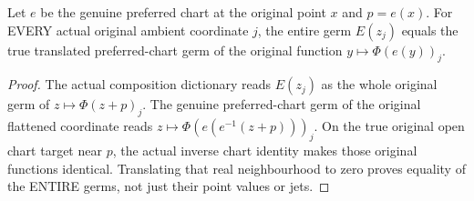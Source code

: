 \begin{lemma}
\label{hir:smooth-centre-whole-flattened-coordinate-dictionary}
\leanok
Let $e$ be the genuine preferred chart at the original point $x$ and $p=e(x)$.
For EVERY actual original ambient coordinate $j$, the entire germ
$E(z_j)$ equals the true translated preferred-chart germ of the original
function $y\mapsto\Phi(e(y))_j$.
\end{lemma}
\begin{proof}
The actual composition dictionary reads $E(z_j)$ as the whole original germ
of $z\mapsto\Phi(z+p)_j$. The genuine preferred-chart germ of the original
flattened coordinate reads $z\mapsto\Phi(e(e^{-1}(z+p)))_j$. On the true original
open chart target near $p$, the actual inverse chart identity makes those
original functions identical. Translating that real neighbourhood to zero
proves equality of the ENTIRE germs, not just their point values or jets.
\end{proof}

